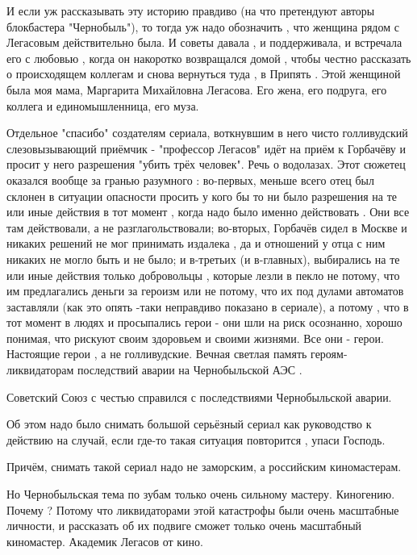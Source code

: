 И если уж рассказывать эту историю  правдиво (на что претендуют авторы
блокбастера "Чернобыль"), то тогда уж надо обозначить , что женщина рядом с
Легасовым действительно была. И советы давала , и поддерживала, и встречала его
с любовью , когда он накоротко возвращался домой , чтобы честно рассказать о
происходящем коллегам и снова вернуться туда , в Припять . Этой женщиной была
моя мама, Маргарита Михайловна Легасова. Его жена, его подруга, его коллега и
единомышленница, его муза. 

Отдельное "спасибо" создателям сериала, воткнувшим в него чисто голливудский
слезовызывающий приёмчик - "профессор Легасов" идёт на приём к Горбачёву и
просит у него разрешения "убить трёх человек". Речь о водолазах. Этот сюжетец
оказался вообще за гранью разумного : во-первых, меньше всего отец был склонен
в ситуации опасности просить у кого бы то ни было разрешения на те или иные
действия в тот момент , когда надо было именно действовать . Они все там
действовали, а не разглагольствовали; во-вторых, Горбачёв сидел в Москве и
никаких решений не мог принимать издалека , да и отношений у отца с ним никаких
не могло быть и не было; и в-третьих (и в-главных), выбирались на те или иные
действия только добровольцы , которые лезли в пекло не потому, что им
предлагались деньги за героизм или не потому, что их под дулами автоматов
заставляли  (как это опять -таки неправдиво показано в сериале), а потому , что
в тот момент в людях и просыпались герои - они шли на риск осознанно, хорошо
понимая, что рискуют своим здоровьем и своими жизнями. Все они - герои.
Настоящие герои , а не голливудские. Вечная светлая память героям- ликвидаторам
последствий аварии на Чернобыльской АЭС .

Советский Союз с честью справился с последствиями Чернобыльской аварии. 

Об этом надо было снимать большой серьёзный сериал как руководство к действию
на случай, если где-то такая ситуация повторится , упаси Господь. 

Причём, снимать такой сериал надо не заморским, а российским киномастерам. 

Но Чернобыльская тема по зубам только очень сильному мастеру. Киногению. Почему
? Потому что ликвидаторами этой катастрофы были очень масштабные личности, и
рассказать об их подвиге сможет только очень масштабный киномастер. Академик
Легасов от кино.
